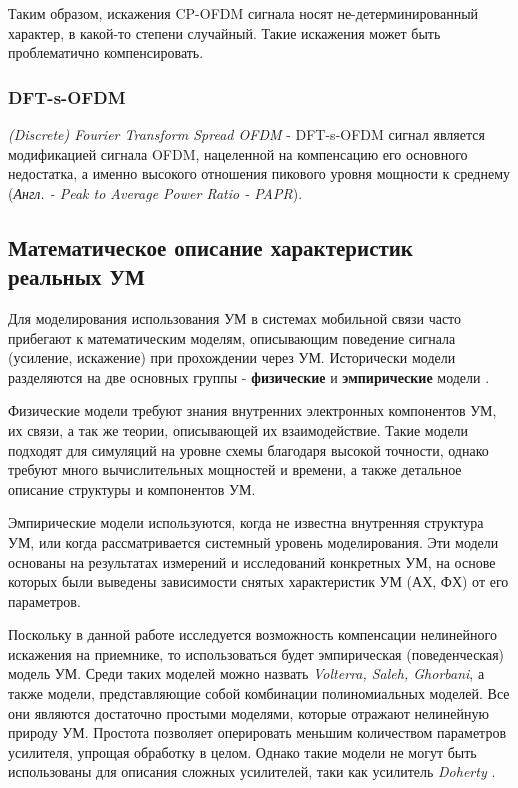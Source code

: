 Таким образом, искажения CP-OFDM сигнала носят не-детерминированный
характер, в какой-то степени случайный. Такие искажения может быть
проблематично компенсировать.

\subsubsection{DFT-s-OFDM}
\textit{(Discrete) Fourier Transform Spread OFDM} - DFT-s-OFDM сигнал
является модификацией сигнала OFDM, нацеленной на компенсацию его основного
недостатка, а именно высокого отношения пикового уровня мощности к среднему
(\textit{Англ. - Peak to Average Power Ratio - PAPR}).


\subsection{Математическое описание характеристик реальных УМ}

Для моделирования использования УМ в системах мобильной связи часто прибегают к
математическим моделям, описывающим поведение сигнала (усиление, искажение) при 
прохождении через УМ. Исторически модели разделяются на две основных
группы - \textbf{физические} и \textbf{эмпирические} модели \cite{cambridge2008}.

Физические модели требуют знания внутренних электронных компонентов УМ, их
связи, а так же теории, описывающей их взаимодействие. Такие модели подходят
для симуляций на уровне схемы благодаря высокой точности, однако требуют
много вычислительных мощностей и времени, а также детальное описание
структуры и компонентов УМ.

Эмпирические модели используются, когда не известна внутренняя структура УМ,
или когда рассматривается системный уровень моделирования. Эти модели
основаны на результатах измерений и исследований конкретных УМ, на основе
которых были выведены зависимости снятых характеристик УМ (АХ, ФХ) от его
параметров.

Поскольку в данной работе исследуется возможность компенсации нелинейного
искажения на приемнике, то использоваться будет эмпирическая
(поведенческая) модель УМ. Среди таких моделей можно назвать
\textit{Volterra, Saleh, Ghorbani}, а также модели, представляющие собой комбинации
полиномиальных моделей. Все они являются достаточно простыми моделями,
которые отражают нелинейную природу УМ. Простота позволяет оперировать
меньшим количеством параметров усилителя, упрощая обработку в целом. Однако
такие модели не могут быть использованы для описания сложных усилителей,
таки как усилитель \textit{Doherty} \cite{Doherty1936}\cite{3gpp.38.803}.

